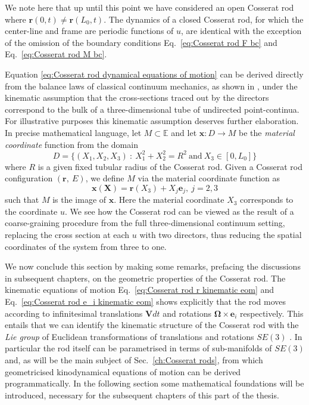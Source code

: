 We note here that up until this point we have considered an open Cosserat rod where $\mathbf{r}(0,t) \neq \mathbf{r}(L_0,t)$. The dynamics of a closed Cosserat rod, for which the center-line and frame are periodic functions of $u$, are identical with the exception of the omission of the boundary conditions Eq.~\ref{eq:Cosserat rod F bc} and Eq.~\ref{eq:Cosserat rod M bc}.

Equation \ref{eq:Cosserat rod dynamical equations of motion} can be derived directly from the balance laws of classical continuum mechanics, as shown in \citep{parkerDerivationNonlinearRod1984, rubinCosseratRods2000}, under the kinematic assumption that the cross-sections traced out by the directors correspond to the bulk of a three-dimensional tube of undirected point-continua. For illustrative purposes this kinematic assumption deserves further elaboration. In precise mathematical language, let $M \subset \mathbb{E}$ and let $\mathbf{x} : D \to M$ be the \textit{material coordinate} function from the domain
\begin{equation}
D = \{ (X_1, X_2, X_3)\ :\ X_1^2 + X_2^2 = R^2\ \text{and}\ X_3 \in [0,L_0]  \}
\end{equation}
where $R$ is a given fixed tubular radius of the Cosserat rod. Given a Cosserat rod configuration $(\mathbf{r},\ E)$, we define $M$ via the material coordinate function as
\begin{equation}
\mathbf{x}(\mathbf{X}) = \mathbf{r}(X_3) + X_j \mathbf{e}_j,\ j=2,3
\end{equation}
such that $M$ is the image of $\mathbf{x}$. Here the material coordinate $X_3$ corresponds to the coordinate $u$. We see how the Cosserat rod can be viewed as the result of a coarse-graining procedure from the full three-dimensional continuum setting, replacing the cross section at each $u$ with two directors, thus reducing the spatial coordinates of the system from three to one.

We now conclude this section by making some remarks, prefacing the discussions in subsequent chapters, on the geometric properties of the Cosserat rod. The kinematic equations of motion Eq.~\ref{eq:Cosserat rod r kinematic eom} and Eq.~\ref{eq:Cosserat rod e_i kinematic eom} shows explicitly that the rod moves according to infinitesimal translations $\mathbf{V}dt$ and rotations $\boldsymbol{\Omega} \times \mathbf{e}_i$ respectively. This entails that we can identify the kinematic structure of the Cosserat rod with the \textit{Lie group} of Euclidean transformations of translations and rotations $SE(3)$ \citep{simoGeometricallyexactRodModel1991, simoThreedimensionalFinitestrainRod1986}. In particular the rod itself can be parametrised in terms of sub-manifolds of $SE(3)$ and, as will be the main subject of Sec.~\ref{ch:Cosserat rods}, from which geometricised kinodynamical equations of motion can be derived programmatically. In the following section some mathematical foundations will be introduced, necessary for the subsequent chapters of this part of the thesis.

